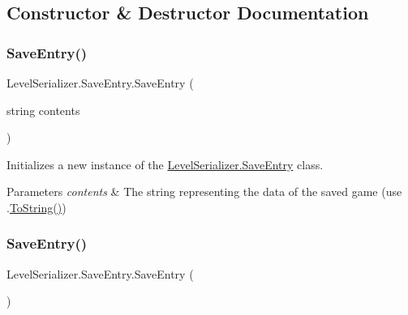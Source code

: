\subsection{Constructor \& Destructor Documentation}
\mbox{\label{class_level_serializer_1_1_save_entry_a60b88cee5e6967c3b5b026ad78b4bc88}} 
\subsubsection{\texorpdfstring{Save\+Entry()}{SaveEntry()}\hspace{0.1cm}{\footnotesize\ttfamily [1/2]}}
{\footnotesize\ttfamily Level\+Serializer.\+Save\+Entry.\+Save\+Entry (\begin{DoxyParamCaption}\item[{string}]{contents }\end{DoxyParamCaption})\hspace{0.3cm}{\ttfamily [inline]}}



Initializes a new instance of the \hyperlink{class_level_serializer_1_1_save_entry}{Level\+Serializer.\+Save\+Entry} class. 


\begin{DoxyParams}{Parameters}
{\em contents} & The string representing the data of the saved game (use .\hyperlink{class_level_serializer_1_1_save_entry_a643faa4c478ba8fed108000aa3493157}{To\+String()}) \\
\hline
\end{DoxyParams}
\mbox{\label{class_level_serializer_1_1_save_entry_afaecdc1beab475cac800209c45506b4e}} 
\subsubsection{\texorpdfstring{Save\+Entry()}{SaveEntry()}\hspace{0.1cm}{\footnotesize\ttfamily [2/2]}}
{\footnotesize\ttfamily Level\+Serializer.\+Save\+Entry.\+Save\+Entry (\begin{DoxyParamCaption}{ }\end{DoxyParamCaption})\hspace{0.3cm}{\ttfamily [inline]}}



